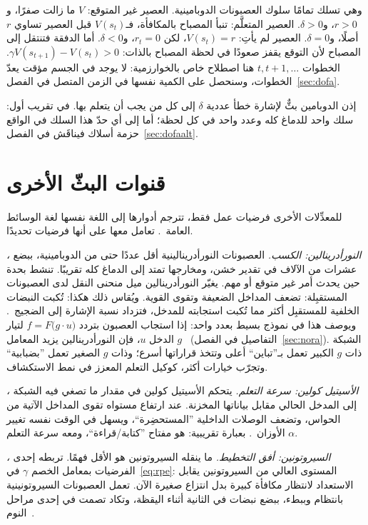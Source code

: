 وهي تسلك تمامًا سلوك العصبونات الدوبامينية. العصير غير المتوقع: $V$ ما زالت صفرًا، و$r>0$، و$\delta>0$. العصير المتعلَّم: تنبأ المصباح بالمكافأة، فـ$V(s_t)$ قبل العصير تساوي $r$ أصلًا، و$\delta=0$. العصير لم يأتِ: $V(s_t)=r$، لكن $r_t=0$، و$\delta<0$. أما الدفقة فتنتقل إلى المصباح لأن التوقع يقفز صعودًا في لحظة المصباح بالذات: $\gamma V(s_{t+1})-V(s_t)>0$. الخطوات $t,t+1,\dots$ هنا اصطلاح خاص بالخوارزمية: لا يوجد في الجسم مؤقت يعدّ الخطوات، وسنحصل على الكمية نفسها في الزمن المتصل في الفصل~\ref{sec:dofa}.

إذن الدوبامين بثٌّ لإشارة خطأ عددية $\delta$ إلى كل من يجب أن يتعلم بها. في تقريب أول: سلك واحد للدماغ كله وعدد واحد في كل لحظة؛ أما إلى أي حدّ هذا السلك في الواقع حزمة أسلاك فيناقَش في الفصل~\ref{sec:dofaalt}.

\section{قنوات البثّ الأخرى}

للمعدِّلات الأخرى فرضيات عمل فقط، تترجم أدوارها إلى اللغة نفسها لغة الوسائط العامة~\cite{Doya2002}. تعامل معها على أنها فرضيات تحديدًا.

\emph{، النورأدرينالين: الكسب.} العصبونات النورأدرينالينية أقل عددًا حتى من الدوبامينية، ببضع عشرات من الآلاف في تقدير خشن، ومخارجها تمتد إلى الدماغ كله تقريبًا. تنشط بحدة حين يحدث أمر غير متوقع أو مهم. يغيّر النورأدرينالين ميل منحنى النقل لدى العصبونات المستقبِلة: تضعف المداخل الضعيفة وتقوى القوية. ويُقاس ذلك هكذا: تُكبت النبضات الخلفية للمستقبِل أكثر مما تُكبت استجابته للمدخل، فتزداد نسبة الإشارة إلى الضجيج~\cite{Foote1975NE}. ويوصف هذا في نموذج بسيط بعدد واحد: إذا استجاب العصبون بتردد $f=F\bigl(g\cdot u\bigr)$ لتيار الدخل $u$، فإن النورأدرينالين يزيد المعامل $g$~\cite{AstonJones2005} (التفاصيل في الفصل~\ref{sec:nora}). الشبكة ذات $g$ الكبير تعمل بـ”تباين“ أعلى وتتخذ قراراتها أسرع؛ وذات $g$ الصغير تعمل ”بضبابية“ وتجرّب خيارات أكثر، كوكيل التعلم المعزز في نمط الاستكشاف.

\emph{، الأسيتيل كولين: سرعة التعلم.} يتحكم الأسيتيل كولين في مقدار ما تصغي فيه الشبكة إلى المدخل الحالي مقابل بياناتها المخزنة. عند ارتفاع مستواه تقوى المداخل الآتية من الحواس، وتضعف الوصلات الداخلية ”المستحضِرة“، ويسهل في الوقت نفسه تغيير الأوزان~\cite{Hasselmo2006}. بعبارة تقريبية: هو مفتاح ”كتابة/قراءة“، ومعه سرعة التعلم $\alpha$.

\emph{، السيروتونين: أفق التخطيط.} ما ينقله السيروتونين هو الأقل فهمًا. تربطه إحدى الفرضيات بمعامل الخصم $\gamma$ في~\eqref{eq:rpe}: المستوى العالي من السيروتونين يقابل الاستعداد لانتظار مكافأة كبيرة بدل انتزاع صغيرة الآن. تعمل العصبونات السيروتونينية بانتظام وببطء، ببضع نبضات في الثانية أثناء اليقظة، وتكاد تصمت في إحدى مراحل النوم~\cite{JacobsAzmitia1992}.

